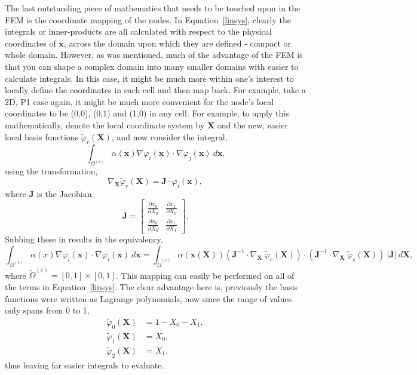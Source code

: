 The last outstanding piece of mathematics that needs to be touched upon in the FEM is the coordinate mapping of the nodes. In Equation~\ref{linsys}, clearly the integrals or inner-products are all calculated with respect to the physical coordinates of $\mathbf{x}$, across the domain upon which they are defined - compact or whole domain. However, as was mentioned, much of the advantage of the FEM is that you can shape a complex domain into many smaller domains with easier to calculate integrals. In this case, it might be much more within one's interest to locally define the coordinates in each cell and then map back. For example, take a 2D, P1 case again, it might be much more convenient for the node's local coordinates to be (0,0), (0,1) and (1,0) in any cell. For example, to apply this mathematically, denote the local coordinate system by $\mathbf{X}$ and the new, easier local basis functions $\widetilde\varphi_r(\mathbf{X})$, and now consider the integral,
\begin{equation}
	\int_{\Omega^{(e)}} \alpha(\mathbf{x})\nabla \varphi_i(\mathbf{x}) \cdot \nabla \varphi_j(\mathbf{x})~d\mathbf{x}.
\end{equation}
using the transformation,
\begin{equation}
	\nabla_\mathbf{X}\widetilde\varphi_r(\mathbf{X}) = \mathbf{J}\cdot \varphi_i(\mathbf{x}),
\end{equation}
where $\mathbf{J}$ is the Jacobian,
\begin{equation}
	\mathbf{J} =
	\left[\begin{matrix}
		\frac{\partial x_0}{\partial X_0} & \frac{\partial x_1}{\partial X_0}\\
		\frac{\partial x_0}{\partial X_0} & \frac{\partial x_1}{\partial X_1}
	\end{matrix}\right].
\end{equation}
Subbing these in results in the equivalency,
\begin{equation}
	\int_{\Omega^{(e)}} \alpha(x)\nabla \varphi_i(\mathbf{x}) \cdot \nabla \varphi_i(\mathbf{x})~d\mathbf{x} = \int_{\widetilde{\Omega}^{(e)}} \alpha(\mathbf{x}(\mathbf{X}))(\mathbf{J}^{-1}\cdot\nabla_\mathbf{X}~\widetilde\varphi_r(\mathbf{X}) )\cdot(\mathbf{J}^{-1}\cdot\nabla_\mathbf{X}~\widetilde\varphi_s(\mathbf{X}))~\vert\mathbf{J}\vert~d\mathbf{X},
\end{equation}
where ${\widetilde{\Omega}^{(e)}} = [0,1]\times[0,1]$. This mapping can easily be performed on all of the terms in Equation~\eqref{linsys}. The clear advantage here is, previously the basis functions were written as Lagrange polynomials, now since the range of values only spans from 0 to 1,
\begin{align}
	\widetilde\varphi_0(\mathbf{X}) &= 1 - X_0 - X_1,\\
	\widetilde\varphi_1(\mathbf{X}) &= X_0,\\
	\widetilde\varphi_2(\mathbf{X}) &= X_1,
\end{align}
thus leaving far easier integrals to evaluate.~\cite{mardal}

